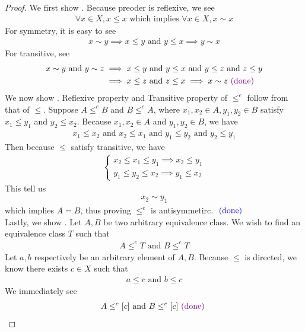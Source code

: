 \documentclass{report}
\begin{document}
\begin{proof}
We first show . Because preoder is reflexive, we see 
\begin{align*}
\forall x\in X, x\leq x\text{ which implies }\forall x \in X, x \sim x
\end{align*}
For symmetry, it is easy to see 
\begin{align*}
x\sim y \implies x\leq y\text{ and }y\leq x\implies y\sim x
\end{align*}
For transitive, see 
\begin{align*}
  x\sim y \text{ and } y\sim z&\implies x\leq y \text{ and }y \leq x \text{ and }y\leq z \text{ and }z \leq y \\
&\implies x\leq z\text{ and } z\leq x\implies x\sim z \textcolor{violet}{\text{ (done) }}
\end{align*}
We now show . Reflexive property and Transitive property of $\leq^e$ follow from that of $\leq $. Suppose $A\leq^e B$ and $B\leq^e A$, where $x_1,x_2\in A,y_1,y_2\in B$ satisfy $x_1\leq y_1$ and $y_2\leq x_2$. Because $x_1,x_2 \in A$ and $y_1,y_2\in B$, we have 
\begin{align*}
x_1\leq x_2\text{ and }x_2\leq x_1\text{ and }y_1\leq y_2\text{ and }y_2\leq y_1
\end{align*}
Then because $\leq $ satisfy transitive, we have 
\begin{align*}
\begin{cases}
  x_2\leq x_1\leq y_1 \implies x_2\leq y_1\\
  y_1\leq y_2\leq x_2 \implies y_1\leq x_2
\end{cases}
\end{align*}
This tell us 
\begin{align*}
x_2 \sim y_1
\end{align*}
which implies $A=B$, thus proving  $\leq^e$ is antisymmetirc. $\textcolor{blue}{\text{ (done) }}$\\

Lastly, we show  . Let $A,B$ be two arbitrary equivalence class. We wish to find an equivalence class $T$ such that 
\begin{align*}
A\leq^e T \text{ and } B\leq^e T
\end{align*}
Let $a,b$ respectively be an arbitrary element of $A,B$. Because  $\leq $ is directed, we know there exists $c\in X$ such that 
\begin{align*}
a\leq c\text{ and }b\leq c
\end{align*}
We immediately see 
\begin{align*}
A\leq^e [c] \text{ and } B\leq^e [c] \textcolor{violet}{\text{ (done) }}
\end{align*}
\end{proof}
\end{document}
